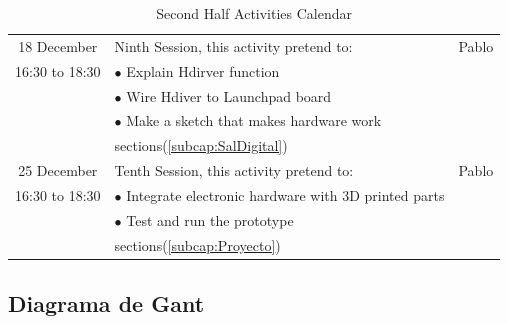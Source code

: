 \documentclass[]{article}
\begin{document}
\begin{table}[h!]
\begin{tabular}{|c|l|c|}
		18 December & Ninth Session, this activity pretend to: & Pablo \\ 
		16:30 to 18:30 & $\bullet$ Explain Hdirver function &     \\
		& $\bullet$ Wire Hdiver to Launchpad board &     \\ 
		& $\bullet$ Make a sketch that makes hardware work & \\ 
		& sections(\ref{subcap:SalDigital})& \\ \hline
		
	    25 December& Tenth Session, this activity pretend to: & Pablo \\ 
		16:30 to 18:30 & $\bullet$ Integrate electronic hardware with 3D printed parts &     \\
		& $\bullet$ Test and run the prototype&     \\ 
		& sections(\ref{subcap:Proyecto}) & \\ \hline
		
	\end{tabular}
	\caption{Second Half Activities Calendar}
	\label{cuadroCurso1}
\end{table}



\subsection{Diagrama de Gant}
\end{document}

